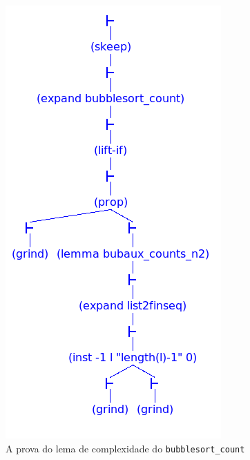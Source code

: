 \begin{figure}[H]
\begin{minipage}{0.475\linewidth}
    \centering
    \includegraphics[width=\linewidth,trim={0 0 0 0},clip]{figures/bubblesort-count.png}
    \caption{A prova do lema de complexidade do \texttt{bubblesort\_count}
}
\end{minipage}
\end{figure}
